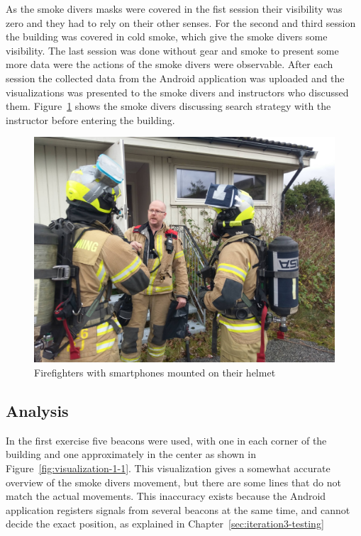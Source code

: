 \documentclass[../Main/thesis.tex]{subfiles}
\begin{document}
As the smoke divers masks were covered in the fist session their visibility was zero and they had to rely on their other senses.
For the second and third session the building was covered in cold smoke, which give the smoke divers some visibility.
The last session was done without gear and smoke to present some more data were the actions of the smoke divers were observable.
After each session the collected data from the Android application was uploaded and the visualizations was presented to the smoke divers and instructors who discussed them.
Figure~\ref{fig:eval-firefighters} shows the smoke divers discussing search strategy with the instructor before entering the building.

\begin{figure}[h]
	\centering
	\includegraphics[width=\textwidth]{../fig/firefighters-with-helmet}
	\caption{Firefighters with smartphones mounted on their helmet}
	\label{fig:eval-firefighters}
\end{figure}

\subsection{Analysis}
In the first exercise five beacons were used, with one in each corner of the building and one approximately in the center as shown in Figure~\ref{fig:visualization-1-1}.
This visualization gives a somewhat accurate overview of the smoke divers movement, but there are some lines that do not match the actual movements.
This inaccuracy exists because the Android application registers signals from several beacons at the same time, and cannot decide the exact position, as explained in Chapter~\ref{sec:iteration3-testing}
\end{document}
